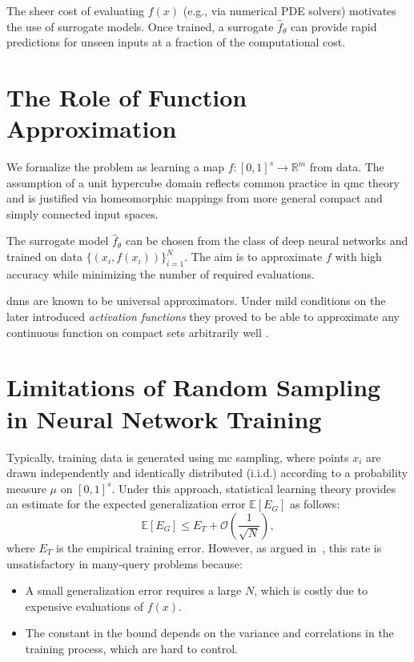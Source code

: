 The sheer cost of evaluating $f(x)$ (e.g., via numerical PDE solvers) motivates
the use of surrogate models. Once trained, a surrogate $\hat{f}_\theta$ can
provide rapid predictions for unseen inputs at a fraction of the computational
cost.

\section{The Role of Function Approximation}
We formalize the problem as learning a map $f \colon [0,1]^s \to \mathbb{R}^m$
from data. The assumption of a unit hypercube domain reflects common practice in
\ac{qmc} theory and is justified via homeomorphic mappings from more general
compact and simply connected input spaces.

The surrogate model $\hat{f}_\theta$ can be chosen from the class of deep neural
networks and trained on data $\{(x_i, f(x_i))\}_{i=1}^N$. The aim is to
approximate $f$ with high accuracy while minimizing the number of required
evaluations.

\aclp{dnn} are known to be universal approximators. Under mild conditions on the
later introduced \emph{activation functions} they proved to be able to
approximate any continuous function on compact sets arbitrarily well
\cite{cybenko1989approximation}.

\section{Limitations of Random Sampling in Neural Network Training}
Typically, training data is generated using \acl{mc} sampling, where points $x_i$ are drawn independently and identically distributed (i.i.d.) according to a probability measure $\mu$ on $[0,1]^s$. Under this approach, statistical learning theory provides an estimate for the expected generalization error $\mathbb{E}[E_G]$ as follows:
\begin{equation*}
\mathbb{E}[E_G] \leq E_T + \mathcal{O}\left(\frac{1}{\sqrt{N}}\right),
\end{equation*}
where $E_T$ is the empirical training error. However, as argued
in~\cite{mishra2021enhancing}, this rate is unsatisfactory in many-query
problems because:
\begin{itemize}
  \item A small generalization error requires a large $N$, which is costly due
  to expensive evaluations of $f(x)$.
  \item The constant in the bound depends on the variance and correlations in
  the training process, which are hard to control.
\end{itemize}

